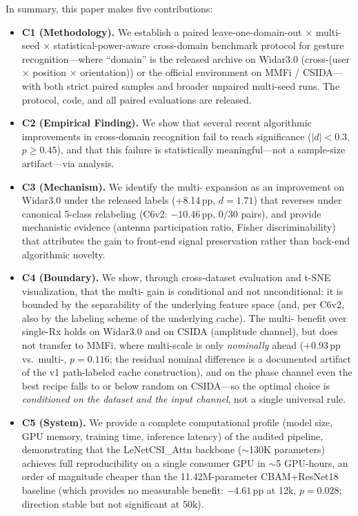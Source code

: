 \documentclass[journal,11pt]{IEEEtran}
\newcommand{\BVP}{\text{BVP}}
\newcommand{\CSI}{\text{CSI}}
\newcommand{\MDE}{\text{MDE}}
\newcommand{\Rx}{\text{Rx}}
\begin{document}
In summary, this paper makes five contributions:
\begin{itemize}
    \item \textbf{C1 (Methodology).} We establish a paired leave-one-domain-out $\times$ multi-seed $\times$ statistical-power-aware cross-domain benchmark protocol for \CSI{} gesture recognition---where ``domain'' is the released archive on Widar3.0 (cross-(user $\times$ position $\times$ orientation)) or the official environment on MMFi / CSIDA---with both strict paired samples and broader unpaired multi-seed runs. The protocol, code, and all paired evaluations are released.
    \item \textbf{C2 (Empirical Finding).} We show that several recent algorithmic improvements in \CSI{} cross-domain recognition fail to reach significance ($|d| < 0.3$, $p \geq 0.45$), and that this failure is statistically meaningful---not a sample-size artifact---via \MDE{} analysis.
    \item \textbf{C3 (Mechanism).} We identify the \BVP{} multi-\Rx{} expansion as an improvement on Widar3.0 under the released labels (+8.14\,pp, $d = 1.71$) that reverses under canonical 5-class relabeling (C6v2: $-10.46$\,pp, $0/30$ pairs), and provide mechanistic evidence (antenna participation ratio, Fisher discriminability) that attributes the gain to front-end signal preservation rather than back-end algorithmic novelty.
    \item \textbf{C4 (Boundary).} We show, through cross-dataset evaluation and t-SNE visualization, that the multi-\Rx{} gain is conditional and not unconditional: it is bounded by the separability of the underlying feature space (and, per C6v2, also by the labeling scheme of the underlying cache). The multi-\Rx{} benefit over single-Rx holds on Widar3.0 and on CSIDA (amplitude channel), but does not transfer to MMFi, where multi-scale is only \emph{nominally} ahead ($+0.93$\,pp vs.\ multi-\Rx, $p = 0.116$; the residual nominal difference is a documented artifact of the v1 path-labeled cache construction), and on the phase channel even the best recipe falls to or below random on CSIDA---so the optimal choice is \emph{conditioned on the dataset and the input channel}, not a single universal rule.
    \item \textbf{C5 (System).} We provide a complete computational profile (model size, GPU memory, training time, inference latency) of the audited pipeline, demonstrating that the LeNetCSI\_Attn backbone ($\sim$130K parameters) achieves full reproducibility on a single consumer GPU in $\sim$5 GPU-hours, an order of magnitude cheaper than the 11.42M-parameter CBAM+ResNet18 baseline (which provides no measurable benefit: $-4.61$\,pp at 12k, $p = 0.028$; direction stable but not significant at 50k).
\end{itemize}
\end{document}
